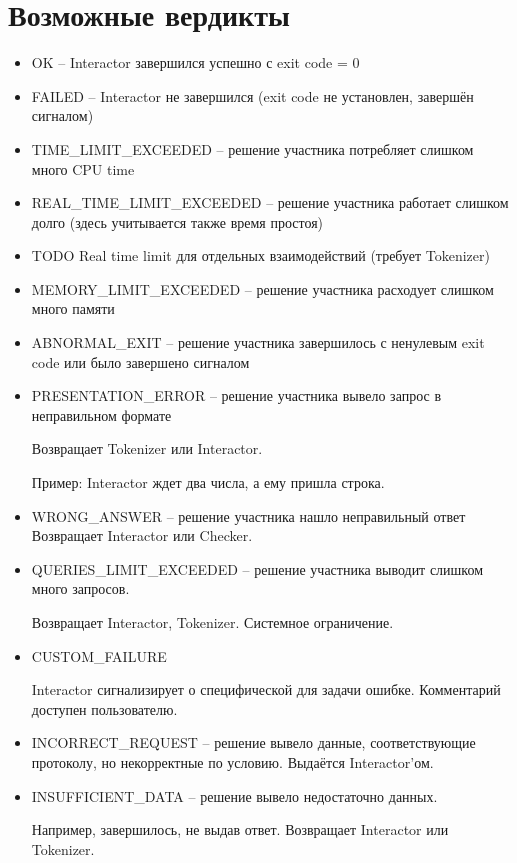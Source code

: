 \section{Возможные вердикты}
\begin{itemize}
    \item OK -- Interactor завершился успешно с exit code = 0
    \item FAILED -- Interactor не завершился (exit code не установлен, завершён сигналом)
    \item TIME\_LIMIT\_EXCEEDED -- решение участника потребляет слишком много CPU time
    \item REAL\_TIME\_LIMIT\_EXCEEDED -- решение участника работает слишком долго (здесь учитывается также время простоя)
    \item TODO Real time limit для отдельных взаимодействий (требует Tokenizer)
    \item MEMORY\_LIMIT\_EXCEEDED -- решение участника расходует слишком много памяти
    \item ABNORMAL\_EXIT -- решение участника завершилось с ненулевым exit code или было завершено сигналом

    \item PRESENTATION\_ERROR -- решение участника вывело запрос в неправильном формате

        Возвращает Tokenizer или Interactor.

        Пример: Interactor ждет два числа, а ему пришла строка.

    \item WRONG\_ANSWER -- решение участника нашло неправильный ответ
        Возвращает Interactor или Checker.

    \item QUERIES\_LIMIT\_EXCEEDED -- решение участника выводит слишком много запросов.

        Возвращает Interactor, Tokenizer.
        Системное ограничение.

    \item CUSTOM\_FAILURE

        Interactor сигнализирует о специфической для задачи ошибке.
        Комментарий доступен пользователю.

    \item INCORRECT\_REQUEST -- решение вывело данные, соответствующие протоколу, но некорректные по условию.
        Выдаётся Interactor'ом.

    \item INSUFFICIENT\_DATA -- решение вывело недостаточно данных.

        Например, завершилось, не выдав ответ.
        Возвращает Interactor или Tokenizer.
\end{itemize}

